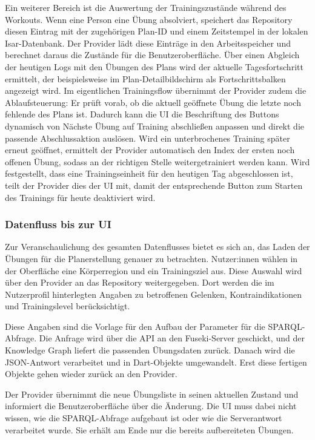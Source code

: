 Ein weiterer Bereich ist die Auswertung der Trainingszustände während des Workouts. Wenn eine Person eine Übung absolviert, speichert das Repository diesen Eintrag mit der zugehörigen Plan-ID und einem Zeitstempel in der lokalen Isar-Datenbank. Der Provider lädt diese Einträge in den Arbeitsspeicher und berechnet daraus die Zustände für die Benutzeroberfläche. Über einen Abgleich der heutigen Logs mit den Übungen des Plans wird der aktuelle Tagesfortschritt ermittelt, der beispielsweise im Plan-Detailbildschirm als Fortschrittsbalken angezeigt wird. Im eigentlichen Trainingsflow übernimmt der Provider zudem die Ablaufsteuerung: Er prüft vorab, ob die aktuell geöffnete Übung die letzte noch fehlende des Plans ist. Dadurch kann die UI die Beschriftung des Buttons dynamisch von \glqq Nächste Übung\grqq{} auf \glqq Training abschließen\grqq{} anpassen und direkt die passende Abschlussaktion auslösen. Wird ein unterbrochenes Training später erneut geöffnet, ermittelt der Provider automatisch den Index der ersten noch offenen Übung, sodass an der richtigen Stelle weitergetrainiert werden kann. Wird festgestellt, dass eine Trainingseinheit für den heutigen Tag abgeschlossen ist, teilt der Provider dies der UI mit, damit der entsprechende Button zum Starten des Trainings für heute deaktiviert wird.

\subsubsection{Datenfluss bis zur UI}

Zur Veranschaulichung des gesamten Datenflusses bietet es sich an, das Laden der Übungen für die Planerstellung genauer zu betrachten. Nutzer:innen wählen in der Oberfläche eine Körperregion und ein Trainingsziel aus. Diese Auswahl wird über den Provider an das Repository weitergegeben. Dort werden die im Nutzerprofil hinterlegten Angaben zu betroffenen Gelenken, Kontraindikationen und Trainingslevel berücksichtigt.

Diese Angaben sind die Vorlage für den Aufbau der Parameter für die SPARQL-Abfrage. Die Anfrage wird über die API an den Fuseki-Server geschickt, und der Knowledge Graph liefert die passenden Übungsdaten zurück. Danach wird die JSON-Antwort verarbeitet und in Dart-Objekte umgewandelt. Erst diese fertigen Objekte gehen wieder zurück an den Provider.

Der Provider übernimmt die neue Übungsliste in seinen aktuellen Zustand und informiert die Benutzeroberfläche über die Änderung. Die UI muss dabei nicht wissen, wie die SPARQL-Abfrage aufgebaut ist oder wie die Serverantwort verarbeitet wurde. Sie erhält am Ende nur die bereits aufbereiteten Übungen.

